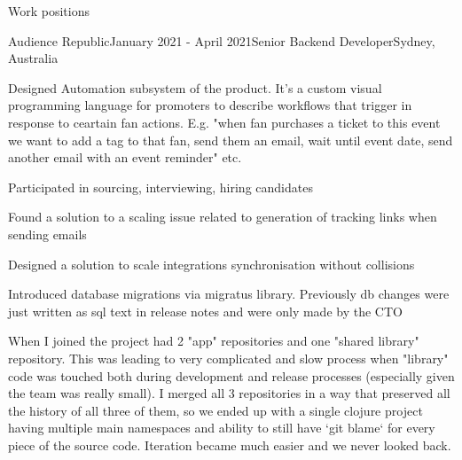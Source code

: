 \documentclass{resume} %
\begin{document}
\begin{rSection}{Work positions}
\begin{rSubsection}{Audience Republic}{January 2021 - April 2021}{Senior Backend Developer}{Sydney, Australia} %
\item Designed Automation subsystem of the product. It's a custom visual programming language for promoters to describe
    workflows that trigger in response to ceartain fan actions. E.g. "when fan purchases a ticket to this event we want
    to add a tag to that fan, send them an email, wait until event date, send another email with an event reminder" etc.
\item Participated in sourcing, interviewing, hiring candidates
\item Found a solution to a scaling issue related to generation of tracking links when sending emails 
\item Designed a solution to scale integrations synchronisation without collisions %
\item Introduced database migrations via migratus library. Previously db changes were
    just written as sql text in release notes and were only made by the CTO
\item When I joined the project had 2 "app" repositories and one "shared library" repository. This was leading to very
    complicated and slow process when "library" code was touched both during development and release processes (especially
    given the team was really small). I merged all 3 repositories in a way that preserved all the history of all three of
    them, so we ended up with a single clojure project having multiple main namespaces and ability to still have `git blame`
    for every piece of the source code. Iteration became much easier and we never looked back.
~
\end{rSubsection}


\end{rSection}
\end{document}

